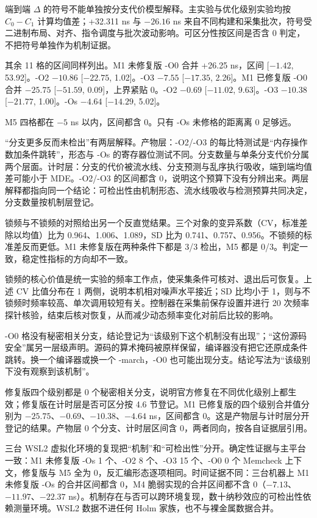 端到端 $\Delta$ 的符号不能单独按分支代价模型解释。主实验与优化级别实验均按 $C_0-C_1$ 计算均值差；+32.311 ns 与 $-26.16$ ns 来自不同构建和采集批次，符号受二进制布局、对齐、指令调度与批次波动影响。可区分性按区间是否含 0 判定，不把符号单独作为机制证据。%

其余 11 格的区间同样列出。M1 未修复版 -O0 合并 +26.25 ns，区间 [$-1.42$, 53.92]。-O2 $-10.86$ [$-22.75$, 1.02]。-O3 $-7.55$ [$-17.35$, 2.26]。M1 已修复版 -O0 合并 $-25.75$ [$-51.59$, 0.09]，上界紧贴 0。-O2 $-0.69$ [$-11.02$, 9.63]。-O3 $-10.38$ [$-21.77$, 1.00]。-Os $-4.64$ [$-14.29$, 5.02]。

M5 四格都在 $-5$ ns 以内，区间都含 0。只有 -Os 未修格的距离离 0 足够远。

“分支更多反而未检出”有两层解释。产物层：-O2/-O3 的每比特测试是“内存操作数加条件跳转”，形态与 -Os 的寄存器位测试不同。分支数量与单条分支代价分属两个层面。计时层：分支的代价被流水线、分支预测与乱序执行吸收，端到端均值差可能小于 MDE。-O2/-O3 的区间都含 0，说明这个预算下没有分辨出来。两层解释都指向同一个结论：可检出性由机制形态、流水线吸收与检测预算共同决定，分支数量按机制层登记。

锁频与不锁频的对照给出另一个反直觉结果。三个对象的变异系数（CV，标准差除以均值）比为 0.964、1.006、1.089，SD 比为 0.741、0.757、0.956。不锁频的标准差反而更低。M1 未修复版在两种条件下都是 3/3 检出，M5 都是 0/3。判定一致，稳定性指标的方向却不一致。%

锁频的核心价值是统一实验的频率工作点，使采集条件可核对、退出后可恢复。上述 CV 比值分布在 1 两侧，说明本机相对噪声水平接近；SD 比均小于 1，则与不锁频时频率较高、单次调用较短有关。控制器在采集前保存设置并进行 20 次频率探针核验，结束后核对恢复，从而减少动态频率变化对前后比较的影响。


-O0 格没有秘密相关分支，结论登记为“该级别下这个机制没有出现”；“这份源码安全”属另一层级声明。源码的算术掩码被原样保留，编译器没有把它还原成条件跳转。换一个编译器或换一个 -march，-O0 也可能出现分支。结论写法为“该级别下没有观察到该机制”。

修复版四个级别都是 0 个秘密相关分支，说明官方修复在不同优化级别上都生效；修复版在计时层是否可区分按 4.6 节登记。M1 已修复版的四个级别合并值分别为 $-25.75$、$-0.69$、$-10.38$、$-4.64$ ns，区间都含 0。这是产物层与计时层分开登记的结果。产物层 0 个分支、计时层区间含 0，两者同向，按各自证据层引用。

三台 WSL2 虚拟化环境的复现把“机制”和“可检出性”分开。确定性证据与主平台一致：M1 未修复版 -Os 1 个、-O2 8 个、-O3 15 个、-O0 0 个 Memcheck 上下文，修复版与 M5 全为 0，反汇编形态逐项相同。时间证据不同：三台机器上 M1 未修复版 -Os 的合并区间都含 0，M4 脆弱实现的合并区间都不含 0（$-7.13$、$-11.97$、$-22.37$ ns）。机制存在与否可以跨环境复现，数十纳秒效应的可检出性依赖测量环境。WSL2 数据不进任何 Holm 家族，也不与裸金属数据合并。%

